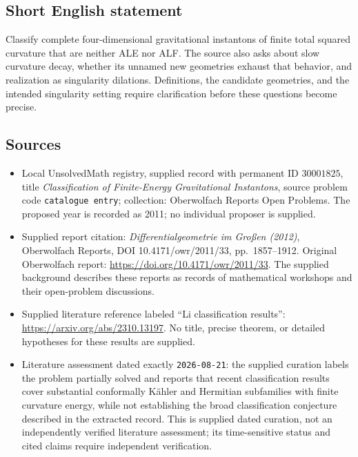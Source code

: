 \documentclass[11pt]{article}
\begin{document}
\subsection{Short English statement}
Classify complete four-dimensional gravitational instantons of finite total squared curvature that are neither ALE nor ALF. The source also asks about slow curvature decay, whether its unnamed new geometries exhaust that behavior, and realization as singularity dilations. Definitions, the candidate geometries, and the intended singularity setting require clarification before these questions become precise.
\subsection{Sources}
\begin{itemize}
\item Local UnsolvedMath registry, supplied record with permanent ID \(30001825\), title \emph{Classification of Finite-Energy Gravitational Instantons}, source problem code \texttt{catalogue entry}; collection: Oberwolfach Reports Open Problems. The proposed year is recorded as 2011; no individual proposer is supplied.
\item Supplied report citation: \emph{Differentialgeometrie im Gro{\ss}en (2012)}, Oberwolfach Reports, DOI 10.4171/owr/2011/33, pp.\ 1857--1912. Original Oberwolfach report: \url{https://doi.org/10.4171/owr/2011/33}. The supplied background describes these reports as records of mathematical workshops and their open-problem discussions.
\item Supplied literature reference labeled ``Li classification results'': \url{https://arxiv.org/abs/2310.13197}. No title, precise theorem, or detailed hypotheses for these results are supplied.
\item Literature assessment dated exactly \texttt{2026-08-21}: the supplied curation labels the problem partially solved and reports that recent classification results cover substantial conformally K\"ahler and Hermitian subfamilies with finite curvature energy, while not establishing the broad classification conjecture described in the extracted record. This is supplied dated curation, not an independently verified literature assessment; its time-sensitive status and cited claims require independent verification.
\end{itemize}
\end{document}
